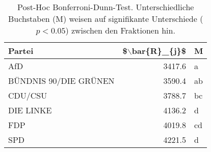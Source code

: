\begin{table}[ht]
\centering
\begin{tabular}{lrl}
  \hline
Partei & \$$\backslash$bar\{R\}\_\{j\}\$ & M \\ 
  \hline
AfD & 3417.6 & a \\ 
  BÜNDNIS 90/DIE GRÜNEN & 3590.4 & ab \\ 
  CDU/CSU & 3788.7 & bc \\ 
  DIE LINKE & 4136.2 & d \\ 
  FDP & 4019.8 & cd \\ 
  SPD & 4221.5 & d \\ 
   \hline
\end{tabular}
\caption[Post-Hoc Bonferroni-Dunn-Test]{Post-Hoc Bonferroni-Dunn-Test. Unterschiedliche Buchstaben (M) 
weisen auf signifikante Unterschiede ($p < 0.05$) zwischen den Fraktionen hin.} 
\end{table}
